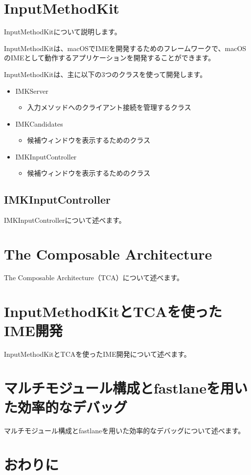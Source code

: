 \documentclass[uplatex,a4j,12pt]{jsarticle}
\begin{document}

\section{InputMethodKit}\label{sec:abount_inputmethodkit}
InputMethodKitについて説明します。

InputMethodKitは、macOSでIMEを開発するためのフレームワークで、macOSのIMEとして動作するアプリケーションを開発することができます。

InputMethodKitは、主に以下の3つのクラスを使って開発します。
\begin{itemize}
    \item IMKServer
    \begin{itemize}
        \item 入力メソッドへのクライアント接続を管理するクラス\cite{bib:imkserver}
    \end{itemize}
    \item IMKCandidates
    \begin{itemize}
        \item 候補ウィンドウを表示するためのクラス\cite{bib:imk_candidates}
    \end{itemize}
    \item IMKInputController
    \begin{itemize}
        \item 候補ウィンドウを表示するためのクラス\cite{bib:imk_input_controller}
    \end{itemize}
\end{itemize}

\subsection{IMKInputController}\label{sec:imkInput_controller}
IMKInputControllerについて述べます。

\section{The Composable Architecture}\label{sec:the_composable_architecture}
The Composable Architecture（TCA）について述べます。

\section{InputMethodKitとTCAを使ったIME開発}\label{sec:use_imk_and_tca}
InputMethodKitとTCAを使ったIME開発について述べます。

\section{マルチモジュール構成とfastlaneを用いた効率的なデバッグ}\label{sec:multi_module_and_fastlane}
マルチモジュール構成とfastlaneを用いた効率的なデバッグについて述べます。

\section{おわりに}\label{sec:conclusion}

 
 
\end{document}
